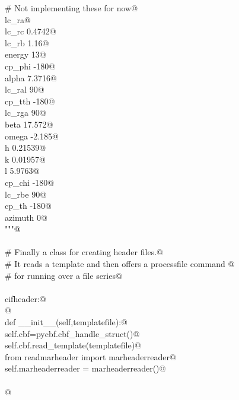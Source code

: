 \documentclass[10pt,a4paper,twoside,notitlepage]{article}
\begin{document}
\begin{flushleft}
\begin{list}{}{}
\mbox{}\verb@    # Not implementing these for now@\\
\mbox{}\verb@    lc_ra@\\
\mbox{}\verb@    lc_rc 0.4742@\\
\mbox{}\verb@    lc_rb 1.16@\\
\mbox{}\verb@    energy 13@\\
\mbox{}\verb@    cp_phi -180@\\
\mbox{}\verb@    alpha 7.3716@\\
\mbox{}\verb@    lc_ral 90@\\
\mbox{}\verb@    cp_tth -180@\\
\mbox{}\verb@    lc_rga 90@\\
\mbox{}\verb@    beta 17.572@\\
\mbox{}\verb@    omega -2.185@\\
\mbox{}\verb@    h 0.21539@\\
\mbox{}\verb@    k 0.01957@\\
\mbox{}\verb@    l 5.9763@\\
\mbox{}\verb@    cp_chi -180@\\
\mbox{}\verb@    lc_rbe 90@\\
\mbox{}\verb@    cp_th -180@\\
\mbox{}\verb@    azimuth 0@\\
\mbox{}\verb@"""@\\
\mbox{}\verb@@\\
\mbox{}\verb@# Finally a class for creating header files.@\\
\mbox{}\verb@# It reads a template and then offers a processfile command @\\
\mbox{}\verb@# for running over a file series@\\
\mbox{}\verb@@\\
\mbox{}\verb@class cifheader:@\\
\mbox{}\verb@    @\\
\mbox{}\verb@    def __init__(self,templatefile):@\\
\mbox{}\verb@        self.cbf=pycbf.cbf_handle_struct()@\\
\mbox{}\verb@        self.cbf.read_template(templatefile)@\\
\mbox{}\verb@        from readmarheader import marheaderreader@\\
\mbox{}\verb@        self.marheaderreader = marheaderreader()@\\
\mbox{}\verb@@\\
\mbox{}\verb@        @\\

\end{list}
\end{flushleft}
\end{document}
